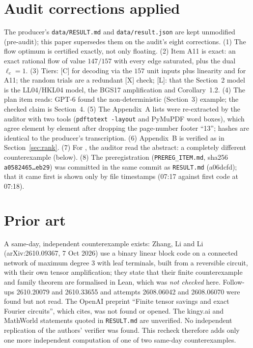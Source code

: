 \documentclass[10pt]{article}
\newcommand{\tier}[1]{\textsf{[#1]}}
\newcommand{\tL}{\tier{L}}
\newcommand{\tC}{\tier{C}}
\newcommand{\tX}{\tier{X}}
\begin{document}
\section{Audit corrections applied}\label{sec:corr}
The producer's \texttt{data/RESULT.md} and \texttt{data/result.json} are kept unmodified (pre-audit); this paper supersedes them on the audit's eight corrections. (1) The flow optimum is certified exactly, not only floating. (2) Item A11 is exact: an exact rational flow of value $147/157$ with every edge saturated, plus the dual $\ell_e=1$. (3) Tiers: \tC{} for decoding via the $157$ unit inputs plus linearity and for A11; the random trials are a redundant \tX{} check; \tL{}: that the Section~2 model is the LL04/HKL04 model, the BGS17 amplification and Corollary~1.2. (4) The plan item reads: GPT-6 found the non-deterministic (Section~3) example; the checked claim is Section~4. (5) The Appendix~A lists were re-extracted by the auditor with two tools (\texttt{pdftotext -layout} and PyMuPDF word boxes), which agree element by element after dropping the page-number footer ``13''; hashes are identical to the producer's transcription. (6) Appendix~B is verified as in Section~\ref{sec:rank}. (7) For \cite{zll}, the auditor read the abstract: a completely different counterexample (below). (8) The preregistration (\texttt{PREREG\_ITEM.md}, sha256 \texttt{a0582465\dots eb29}) was committed in the same commit as \texttt{RESULT.md} (a06dcfd); that it came first is shown only by file timestamps (07:17 against first code at 07:18).

\section{Prior art}\label{sec:prior}
A same-day, independent counterexample exists: Zhang, Li and Li \cite{zll} (arXiv:2610.09367, 7 Oct 2026) use a binary linear block code on a connected network of maximum degree $3$ with leaf terminals, built from a reversible circuit, with their own tensor amplification; they state that their finite counterexample and family theorem are formalised in Lean, which was \emph{not checked} here. Follow-ups 2610.20079 and 2610.33655 and attempts 2608.06042 and 2608.06070 were found but not read. The OpenAI preprint ``Finite tensor savings and exact Fourier circuits'', which \cite{bh} cites, was not found or opened. The kingy.ai and MathWorld statements quoted in \texttt{RESULT.md} are unverified. No independent replication of the authors' verifier was found. This recheck therefore adds only one more independent computation of one of two same-day counterexamples.
\end{document}
